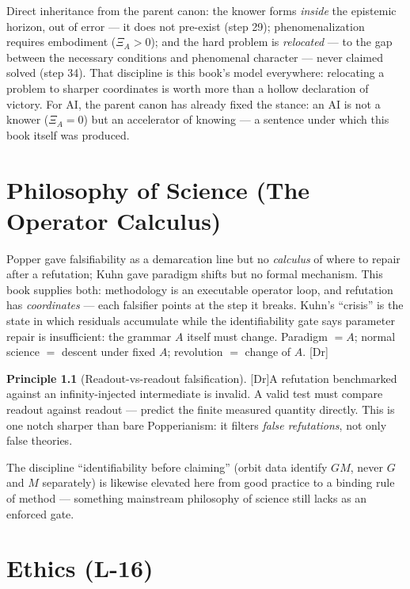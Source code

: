 \documentclass[11pt,a4paper,twoside]{book}
\newcommand{\tier}[1]{\textnormal{\small\textsf{[#1]}}}
\newcommand{\Dr}{\tier{Dr}}\newcommand{\Cj}{\tier{Cj}}\newcommand{\Wf}{\tier{Wf}}
\theoremstyle{plain}
\theoremstyle{definition}
\newtheorem{principle}[theorem]{Principle}
\theoremstyle{remark}
\begin{document}
Direct inheritance from the parent canon: the knower forms \emph{inside} the
epistemic horizon, out of error --- it does not pre-exist (step 29);
phenomenalization requires embodiment ($\Xi_A>0$); and the hard problem is
\emph{relocated} --- to the gap between the necessary conditions and
phenomenal character --- never claimed solved (step 34). That discipline is
this book's model everywhere: relocating a problem to sharper coordinates is
worth more than a hollow declaration of victory. For AI, the parent canon has
already fixed the stance: an AI is not a knower ($\Xi_A=0$) but an
accelerator of knowing --- a sentence under which this book itself was
produced.

\chapter{Philosophy of Science (The Operator Calculus)}

Popper gave falsifiability as a demarcation line but no \emph{calculus} of
where to repair after a refutation; Kuhn gave paradigm shifts but no formal
mechanism. This book supplies both: methodology is an executable operator
loop, and refutation has \emph{coordinates} --- each falsifier points at the
step it breaks. Kuhn's ``crisis'' is the state in which residuals accumulate
while the identifiability gate says parameter repair is insufficient: the
grammar $A$ itself must change. Paradigm $=A$; normal science $=$ descent
under fixed $A$; revolution $=$ change of $A$. \Dr

\begin{principle}[Readout-vs-readout falsification]\Dr\label{prin:rvr}
A refutation benchmarked against an infinity-injected intermediate is
invalid. A valid test must compare readout against readout --- predict the
finite measured quantity directly. This is one notch sharper than bare
Popperianism: it filters \emph{false refutations}, not only false theories.
\end{principle}

The discipline ``identifiability before claiming'' (orbit data identify $GM$,
never $G$ and $M$ separately) is likewise elevated here from good practice to
a binding rule of method --- something mainstream philosophy of science still
lacks as an enforced gate.

\chapter{Ethics (L-16)}
\end{document}
